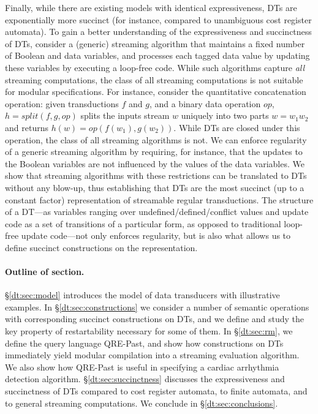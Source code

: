 Finally, while there are existing models
with identical expressiveness, DTs are exponentially more succinct (for instance, compared
to unambiguous cost register automata). To gain a better understanding of the
expressiveness and succinctness of DTs,
consider a (generic) streaming algorithm that maintains a fixed number of Boolean and data
variables, and processes each tagged data value by updating these variables by executing a loop-free
code. While such algorithms capture \emph{all} streaming computations, the class of all streaming
computations is not suitable for modular specifications.
For instance, consider the quantitative concatenation operation:
given transductions $f$ and $g$, and a binary data operation ${\textit{op}}$,
$h={\textit{split}}(f,g,{\textit{op}})$ splits the inputs stream $w$ uniquely into two parts $w=w_1w_2$ and
returns $h(w)={\textit{op}}(f(w_1),g(w_2))$.
While DTs are closed under this operation, the class
of all streaming algorithms is not.
We can enforce regularity of a generic streaming algorithm by requiring, for instance, that the updates to the Boolean
variables are not influenced by the values of the data variables. We show that streaming algorithms
with these restrictions can be translated to DTs without any blow-up, thus establishing that
DTs are the most succinct (up to a constant factor) representation of streamable regular transductions.
The structure of a DT---as variables ranging over undefined/defined/conflict values and update code as a set
of transitions of a particular form, as opposed to traditional loop-free update code---not only enforces regularity, but is also what allows us to define succinct constructions
on the representation.

\paragraph*{Outline of section.}
\S\ref{dt:sec:model} introduces the model of data transducers with illustrative examples.
In \S\ref{dt:sec:constructions} we consider a number of semantic operations with
corresponding succinct constructions on DTs, and we define and study the key property of restartability
necessary for some of them.
In \S\ref{dt:sec:rm}, we define the query language QRE-Past, and show how constructions on DTs
immediately yield modular compilation into a streaming evaluation algorithm.
We also show how QRE-Past is useful in specifying a cardiac arrhythmia
detection algorithm. %
\S\ref{dt:sec:succinctness} discusses the expressiveness and succinctness of DTs compared to cost register automata, to finite automata, and to general streaming computations.
We conclude in \S\ref{dt:sec:conclusions}.

